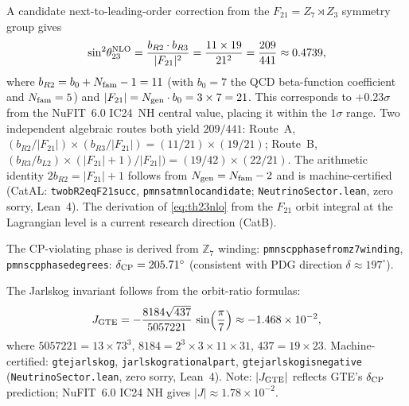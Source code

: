 \documentclass[12pt,a4paper]{article}
\theoremstyle{definition}
\theoremstyle{remark}
\newcommand{\lean}[1]{%
  \penalty-100
  \begingroup\def\_{\textunderscore\allowbreak}\texttt{#1}\endgroup}
\begin{document}
A candidate next-to-leading-order correction from the $F_{21} = Z_7 \rtimes Z_3$ symmetry group gives
\begin{equation}
  \sin^2\!\theta_{23}^{\rm NLO} = \frac{b_{R2}\cdot b_{R3}}{|F_{21}|^2}
    = \frac{11 \times 19}{21^2} = \frac{209}{441} \approx 0.4739,
  \label{eq:th23nlo}
\end{equation}
where $b_{R2} = b_0 + N_{\rm fam} - 1 = 11$ (with $b_0 = 7$ the QCD beta-function
coefficient and $N_{\rm fam} = 5$) and $|F_{21}| = N_{\rm gen} \cdot b_0 = 3 \times 7 = 21$.
This corresponds to $+0.23\sigma$ from the NuFIT~6.0 IC24~NH central value,
placing it within the $1\sigma$ range.
Two independent algebraic routes both yield $209/441$:
Route~A, $(b_{R2}/|F_{21}|)\times(b_{R3}/|F_{21}|) = (11/21)\times(19/21)$;
Route~B, $(b_{R3}/b_{L2})\times(|F_{21}|+1)/|F_{21}|) = (19/42)\times(22/21)$.
The arithmetic identity $2b_{R2} = |F_{21}| + 1$ follows from $N_{\rm gen} = N_{\rm fam} - 2$
and is machine-certified (CatAL: \lean{two\_b\_R2\_eq\_F21\_succ},
\lean{pmns\_atm\_nlo\_candidate};
\texttt{NeutrinoSector.lean}, zero sorry, Lean~4).
The derivation of \eqref{eq:th23nlo} from the $F_{21}$ orbit integral
at the Lagrangian level is a current research direction (CatB).

The CP-violating phase is derived from $\mathbb{Z}_7$ winding:
\lean{pmns\_cp\_phase\_from\_z7\_winding}, \lean{pmns\_cp\_phase\_degrees}:
$\delta_{\rm CP} = 205.71^\circ$ (consistent with PDG direction $\delta\approx197^\circ$).

The Jarlskog invariant follows from the orbit-ratio formulas:
\begin{equation}
  J_{\rm GTE} = -\frac{8184\sqrt{437}}{5057221}\,\sin\!\left(\frac{\pi}{7}\right)
  \approx -1.468\times 10^{-2},
\end{equation}
where $5057221 = 13 \times 73^3$, $8184 = 2^3 \times 3 \times 11 \times 31$,
$437 = 19\times 23$.  Machine-certified: \lean{gte\_jarlskog}, \lean{jarlskog\_rational\_part},
\lean{gte\_jarlskog\_is\_negative} (\texttt{NeutrinoSector.lean}, zero sorry, Lean~4).
Note: $|J_{\rm GTE}|$ reflects GTE's $\delta_{\rm CP}$ prediction; NuFIT~6.0 IC24 NH gives $|J|\approx 1.78\times10^{-2}$.
\end{document}

